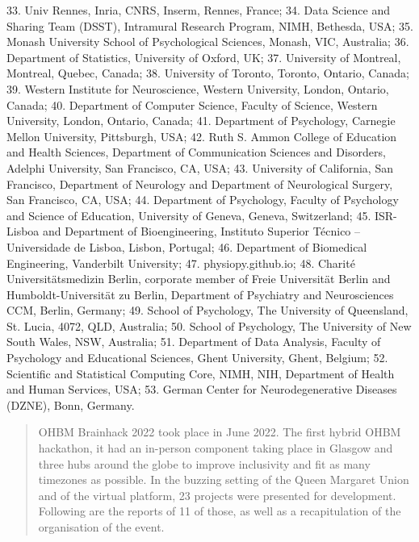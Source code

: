 \documentclass[10pt,a4paper,twocolumns]{proc}
\begin{document}
{33. Univ Rennes, Inria, CNRS, Inserm, Rennes, France; %
34. Data Science and Sharing Team (DSST), Intramural Research Program, NIMH, Bethesda, USA; %
35. Monash University School of Psychological Sciences, Monash, VIC, Australia; %
36. Department of Statistics, University of Oxford, UK; %
37. University of Montreal, Montreal, Quebec, Canada; %
38. University of Toronto, Toronto, Ontario, Canada; %
39. Western Institute for Neuroscience, Western University, London, Ontario, Canada; %
40. Department of Computer Science, Faculty of Science, Western University, London, Ontario, Canada; %
41. Department of Psychology, Carnegie Mellon University, Pittsburgh, USA; %
42. Ruth S. Ammon College of Education and Health Sciences, Department of Communication Sciences and Disorders, Adelphi University, San Francisco, CA, USA; %
43. University of California, San Francisco, Department of Neurology and Department of Neurological Surgery, San Francisco, CA, USA; %
44. Department of Psychology, Faculty of Psychology and Science of Education, University of Geneva, Geneva, Switzerland; %
45. ISR-Lisboa and Department of Bioengineering, Instituto Superior Técnico – Universidade de Lisboa, Lisbon, Portugal; %
46. Department of Biomedical Engineering, Vanderbilt University; %
47. physiopy.github.io; %
48. Charité Universitätsmedizin Berlin, corporate member of Freie Universität Berlin and Humboldt-Universität zu Berlin, Department of Psychiatry and Neurosciences CCM, Berlin, Germany; %
49. School of Psychology, The University of Queensland, St. Lucia, 4072, QLD, Australia; %
50. School of Psychology, The University of New South Wales, NSW, Australia; %
51. Department of Data Analysis, Faculty of Psychology and Educational Sciences, Ghent University, Ghent, Belgium; %
52. Scientific and Statistical Computing Core, NIMH, NIH, Department of Health and Human Services, USA; %
53. German Center for Neurodegenerative Diseases (DZNE), Bonn, Germany.%
}
\\

\begin{abstract}
OHBM Brainhack 2022 took place in June 2022. The first hybrid OHBM hackathon, it had an in-person component taking place in Glasgow and three hubs around the globe to improve inclusivity and fit as many timezones as possible.
In the buzzing setting of the Queen Margaret Union and of the virtual platform, 23 projects were presented for development.
Following are the reports of 11 of those, as well as a recapitulation of the organisation of the event. 
\end{abstract}
\end{document}
